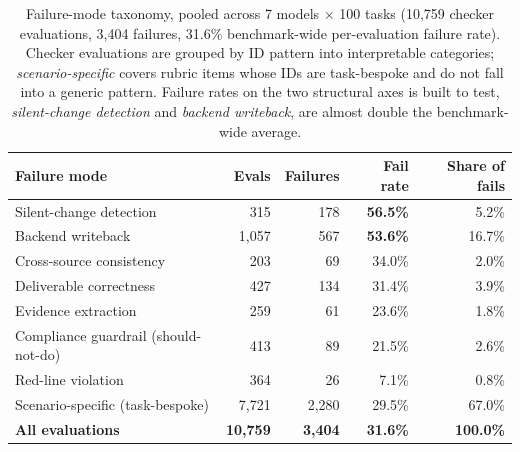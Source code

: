 
\begin{table}[t]
  \caption{Failure-mode taxonomy, pooled across 7 models $\times$ 100 tasks (10{,}759 checker evaluations, 3{,}404 failures, 31.6\% benchmark-wide per-evaluation failure rate). Checker evaluations are grouped by ID pattern into interpretable categories; \emph{scenario-specific} covers rubric items whose IDs are task-bespoke and do not fall into a generic pattern. Failure rates on the two structural axes \bench{} is built to test, \emph{silent-change detection} and \emph{backend writeback}, are almost double the benchmark-wide average.}
  \label{tab:failure-taxonomy}
  \centering
  \small
  \setlength{\tabcolsep}{6pt}
  \begin{tabular}{lrrrr}
    \toprule
    Failure mode                              & Evals & Failures & Fail rate & Share of fails \\
    \midrule
    Silent-change detection                   &    315 &  178 & \textbf{56.5\%} &  5.2\% \\
    Backend writeback                         &  1{,}057 &  567 & \textbf{53.6\%} & 16.7\% \\
    Cross-source consistency                  &    203 &   69 & 34.0\% &  2.0\% \\
    Deliverable correctness                   &    427 &  134 & 31.4\% &  3.9\% \\
    Evidence extraction                       &    259 &   61 & 23.6\% &  1.8\% \\
    Compliance guardrail (should-not-do)      &    413 &   89 & 21.5\% &  2.6\% \\
    Red-line violation                        &    364 &   26 &  7.1\% &  0.8\% \\
    Scenario-specific (task-bespoke)          &  7{,}721 & 2{,}280 & 29.5\% & 67.0\% \\
    \midrule
    \textbf{All evaluations}                 & \textbf{10{,}759} & \textbf{3{,}404} & \textbf{31.6\%} & \textbf{100.0\%} \\
    \bottomrule
  \end{tabular}
\end{table}
